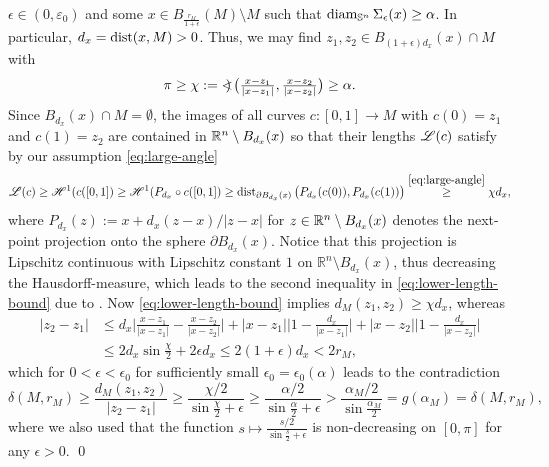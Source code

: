 $\epsilon\in(0,\varepsilon_0)$
and some $x\in B_{\frac{r_M}{1+\epsilon}}(M)\setminus M$
such that $\operatorname{diam}_{\mathbb S^n}\Sigma_\epsilon(x)\ge\alpha$.
In particular, 
$d_x=\operatorname{dist}(x,M)>0$.
Thus, we may find $z_1,z_2\in B_{(1+\epsilon)d_x}(x)\cap M$ 
with
\begin{equation}\label{eq:large-angle}
\textstyle\pi\ge\chi:=\mathop{\mbox{$<\!\!\!)$}}\nolimits\big(\frac{x-z_1}{|x-z_1|},
\frac{x-z_2}{|x-z_2|}\big)\ge\alpha.
\end{equation}
Since $B_{d_x}(x)\cap M=\emptyset$, the images of all curves
 $c:[0,1]\to M$ with $c(0)=z_1$ and $c(1)=z_2$ are  contained in 
 $\mathbb{R}^n\setminus B_{d_x}(x)$ so that their lengths $\mathscr{L}(c)$ satisfy by 
 our assumption \eqref{eq:large-angle}
\begin{equation}\label{eq:lower-length-bound} 
 \mathscr{L}(c)\ge \mathscr{H}^1(c([0,1])\ge \mathscr{H}^1(P_{d_x}\circ c([0,1])\ge\operatorname{dist}_{\partial B_{d_x}(x)}
 \big(P_{d_x}(c(0)),P_{d_x}(c(1))\big)
 \overset{\eqref{eq:large-angle}}{\ge}\chi d_x,
\end{equation} 
 where $P_{d_x}(z):=x+d_x(z-x)/|z-x|$ for $z\in\mathbb{R}^n\setminus B_{d_x}(x)$ denotes
 the next-point projection onto the sphere $\partial B_{d_x}(x)$. Notice that this
 projection is Lipschitz continuous with Lipschitz constant $1$
 on $\mathbb R^n\setminus B_{d_x}(x)$, thus decreasing
 the Hausdorff-measure, which 
 leads to the second inequality in \eqref{eq:lower-length-bound}
 due to \cite[Theorem~2.8]{evans-gariepy_2015}.
Now \eqref{eq:lower-length-bound}  implies $d_M(z_1,z_2)\ge\chi d_x$, whereas
 \begin{align*}
 |z_2-z_1|&\textstyle
 \le d_x\big|\frac{x-z_1}{|x-z_1|}-
 \frac{x-z_2}{|x-z_2|}\big|+|x-z_1|\big|1-\frac{d_x}{|x-z_1|}\big|+
 |x-z_2|\big|1-\frac{d_x}{|x-z_2|}\big|\\
 &\textstyle
 \le 2d_x\sin\frac{\chi}2+2\epsilon d_x\le 2(1+\epsilon)d_x<2r_M,
 \end{align*}
 which for $0<\epsilon<\epsilon_0$ for sufficiently small $\epsilon_0=
 \epsilon_0(\alpha)$ leads to the contradiction
 $$
\textstyle 
\delta(M,r_M)\ge
 \frac{d_M(z_1,z_2)}{|z_2-z_1|}\ge\frac{\chi/2}{\sin\frac{\chi}2 +\epsilon}
 \ge\frac{\alpha/2}{\sin\frac{\alpha}2 +\epsilon}>
 \frac{\alpha_M/2}{\sin\frac{\alpha_M}2}=g(\alpha_M)=\delta(M,r_M),
 $$
 where we also used that the function $s\mapsto\frac{s/2}{\sin\frac{s}2 +\epsilon}$
 is non-decreasing on $[0,\pi]$ for any $\epsilon>0$.
 \qed

